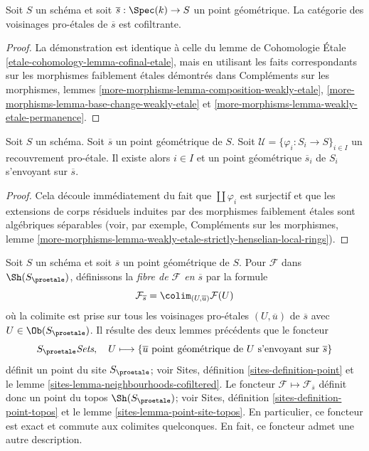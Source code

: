 \begin{lemma}
\label{lemma-cofinal-etale}
Soit $S$ un schéma et soit $\overline{s} : \Spec(k) \to S$ un
point géométrique. La catégorie des voisinages pro-\'etales de
$\overline{s}$ est cofiltrante.
\end{lemma}

\begin{proof}
La démonstration est identique à celle du
lemme de Cohomologie \'Etale \ref{etale-cohomology-lemma-cofinal-etale},
mais en utilisant les faits correspondants sur les morphismes faiblement \'etales
démontrés dans
Compléments sur les morphismes, lemmes
\ref{more-morphisms-lemma-composition-weakly-etale},
\ref{more-morphisms-lemma-base-change-weakly-etale} et
\ref{more-morphisms-lemma-weakly-etale-permanence}.
\end{proof}

\begin{lemma}
\label{lemma-geometric-lift-to-cover}
Soit $S$ un schéma. Soit $\overline{s}$ un point géométrique de $S$.
Soit $\mathcal{U} = \{\varphi_i : S_i \to S\}_{i\in I}$ un
recouvrement pro-\'etale. Il existe alors $i \in I$ et un point
géométrique $\overline{s}_i$ de $S_i$ s'envoyant sur $\overline{s}$.
\end{lemma}

\begin{proof}
Cela découle immédiatement du fait que $\coprod \varphi_i$ est surjectif
et que les extensions de corps résiduels induites par des morphismes faiblement \'etales
sont algébriques séparables (voir, par exemple,
Compléments sur les morphismes, lemme
\ref{more-morphisms-lemma-weakly-etale-strictly-henselian-local-rings}).
\end{proof}

\noindent
Soit $S$ un schéma et soit $\overline{s}$ un point géométrique de $S$.
Pour $\mathcal{F}$ dans $\Sh(S_\proetale)$, définissons la
{\it fibre de $\mathcal{F}$ en $\overline{s}$} par la formule
$$
\mathcal{F}_{\overline{s}} = \colim_{(U, \overline{u})} \mathcal{F}(U)
$$
où la colimite est prise sur tous les voisinages pro-\'etales $(U, \overline{u})$
de $\overline{s}$ avec $U \in \Ob(S_\proetale)$. Il résulte des
deux lemmes précédents que le foncteur
$$
S_\proetale \textit{Sets},\quad
U \longmapsto
\{\overline{u}\text{ point géométrique de }U\text{ s'envoyant sur }\overline{s}\}
$$
définit un point du site $S_\proetale$; voir
Sites, définition \ref{sites-definition-point} et
le lemme \ref{sites-lemma-neighbourhoods-cofiltered}.
Le foncteur $\mathcal{F} \mapsto \mathcal{F}_{\overline{s}}$
définit donc un point du topos $\Sh(S_\proetale)$; voir
Sites, définition \ref{sites-definition-point-topos} et
le lemme \ref{sites-lemma-point-site-topos}. En particulier, ce
foncteur est exact et commute aux colimites quelconques.
En fait, ce foncteur admet une autre description.

